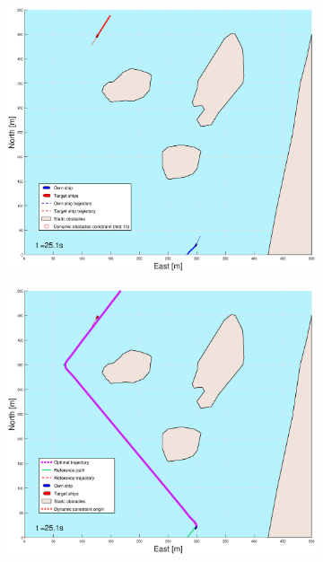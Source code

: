 \begin{figure}[!b]
\begin{subfigure}[b]{0.499\textwidth}
    \end{subfigure}
    \hfill
    \\
    \begin{subfigure}[b]{0.49\textwidth}
        \centering
        \includegraphics[width=\textwidth]{Images/Figures/Helloya/_Simple_1fig1_time=25}
    \end{subfigure}
    \hfill
    \begin{subfigure}[b]{0.499\textwidth}
        \centering
        \includegraphics[width=\textwidth]{Images/Figures/Helloya/_Simple_1fig999_time=25}

\end{subfigure}
\end{figure}

